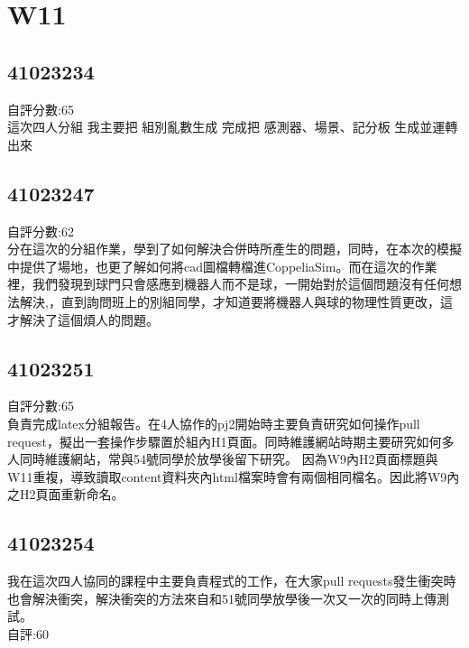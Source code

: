 \chapter{W11}


\section{41023234}
自評分數:65\\這次四人分組 我主要把  組別亂數生成  完成把  感測器、場景、記分板  生成並運轉出來


\section{41023247}
自評分數:62\\分在這次的分組作業，學到了如何解決合併時所產生的問題，同時，在本次的模擬中提供了場地，也更了解如何將cad圖檔轉檔進CoppeliaSim。而在這次的作業裡，我們發現到球門只會感應到機器人而不是球，一開始對於這個問題沒有任何想法解決,，直到詢問班上的別組同學，才知道要將機器人與球的物理性質更改，這才解決了這個煩人的問題。

\section{41023251}
自評分數:65\\負責完成latex分組報告。在4人協作的pj2開始時主要負責研究如何操作pull request，擬出一套操作步驟置於組內H1頁面。同時維護網站時期主要研究如何多人同時維護網站，常與54號同學於放學後留下研究。
因為W9內H2頁面標題與W11重複，導致讀取content資料夾內html檔案時會有兩個相同檔名。因此將W9內之H2頁面重新命名。

\section{41023254}
我在這次四人協同的課程中主要負責程式的工作，在大家pull requests發生衝突時也會解決衝突，解決衝突的方法來自和51號同學放學後一次又一次的同時上傳測試。\\自評:60